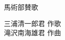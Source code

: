 \documentclass[10pt,b5j]{tarticle} %
\begin{document}
\begin{minipage}[c]{0.7\hsize} %
    \begin{center}
        {\LARGE
            馬術部賛歌 %
        }
        {\small 
        }
    \end{center}
\end{minipage}
\begin{minipage}[c]{0.3\hsize} %
    \begin{flushright} %
        三浦清一郎君 作歌\\滝沢南海雄君 作曲 %
    \end{flushright}
\end{minipage}
\end{document}
